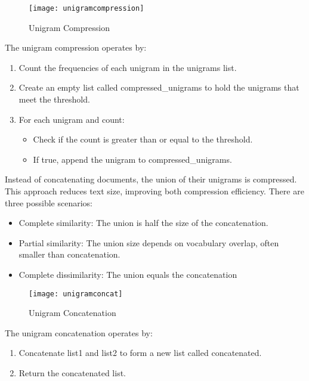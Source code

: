 \documentclass{article}
\begin{document}
\begin{figure}[H]
    \centering
    \texttt{[image: unigramcompression]}
    \caption{Unigram Compression}
    \label{fig:unigram compression}
\end{figure}

The unigram compression operates by: 
\begin{enumerate}
    \item Count the frequencies of each unigram in the unigrams list.
    \item Create an empty list called compressed\_unigrams to hold the unigrams that meet the threshold.
    \item For each unigram and count:
    \begin{itemize}
        \item Check if the count is greater than or equal to the threshold.
        \item If true, append the unigram to compressed\_unigrams.
    \end{itemize}
\end{enumerate}

Instead of concatenating documents, the union of their unigrams is compressed. This approach reduces text size, improving both compression efficiency. There are three possible scenarios:
\begin{itemize}
    \item Complete similarity: The union is half the size of the concatenation.
    \item Partial similarity: The union size depends on vocabulary overlap, often smaller than concatenation.
    \item Complete dissimilarity: The union equals the concatenation
\end{itemize}

\begin{figure}[H]
    \centering
    \texttt{[image: unigramconcat]}
    \caption{Unigram Concatenation}
    \label{fig:unigram concat}
\end{figure}

The unigram concatenation operates by: 
\begin{enumerate}
    \item Concatenate list1 and list2 to form a new list called concatenated.
    \item Return the concatenated list.
\end{enumerate}
\end{document}
